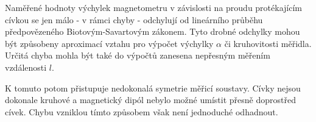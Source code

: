 \documentclass[0-protokol.tex]{subfiles}
\begin{document}
Naměřené hodnoty výchylek magnetometru v závislosti na proudu protékajícím cívkou se jen málo - v rámci chyby - odchylují od lineárního průběhu předpovězeného Biotovým-Savartovým zákonem. Tyto drobné odchylky mohou být způsobeny aproximací vztahu pro výpočet výchylky $\alpha$ či kruhovitosti měřidla. Určitá chyba mohla být také do výpočtů zanesena nepřesným měřením vzdálenosti $l$. 

K tomuto potom přistupuje nedokonalá symetrie měřicí soustavy. Cívky nejsou dokonale kruhové a magnetický dipól nebylo možné umístit přesně doprostřed cívek. Chybu vzniklou tímto způsobem však není jednoduché odhadnout.
\end{document}
